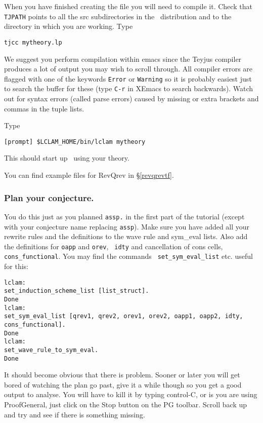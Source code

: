 When you have finished creating the file you will need to compile it.
Check that {\tt TJPATH} points to all the src
subdirectories in the \lclam\ distribution and to the directory in
which you are working.  Type
\begin{verbatim}
tjcc mytheory.lp
\end{verbatim}

We suggest you perform compilation within emacs since the Teyjus
compiler produces a lot of output you may wish to scroll through.  All
compiler errors are flagged with one of the keywords {\tt Error} or
{\tt Warning} so it is probably easiest just to search the buffer for
these (type {\tt C-r} in XEmacs to search backwards).  Watch out for
syntax errors (called parse errors) caused by missing or extra
brackets and commas in the tuple lists.

Type 
\begin{verbatim}
[prompt] $LCLAM_HOME/bin/lclam mytheory
\end{verbatim}
This should start up \lclam\ using your theory.

You can find example files for RevQrev in \S\ref{revqrevtf}. 

\subsubsection*{Plan your conjecture.}
You do this just as you planned {\tt assp.} in the first part of the
tutorial (except with your conjecture name replacing {\tt assp}).
Make sure you have added all your rewrite rules and the definitions
to the wave rule and sym\_eval lists.  Also add the definitions for
{\tt oapp} and {\tt orev}, {\tt
  idty} and cancellation of cons cells, {\tt cons\_functional}.  You may find the commands {\tt
  set\_sym\_eval\_list} etc. useful for this:
\begin{verbatim}
lclam:
set_induction_scheme_list [list_struct].
Done
lclam:
set_sym_eval_list [qrev1, qrev2, orev1, orev2, oapp1, oapp2, idty, cons_functional].
Done
lclam:
set_wave_rule_to_sym_eval.
Done
\end{verbatim}

It should become obvious that there is problem.  Sooner or later you
will get bored of watching the plan go past, give it a while though so
you get a good output to analyse.  You will have to kill it by typing
control-C, or is you are using ProofGeneral, just click on the Stop
button on the PG toolbar.  Scroll back up and try and see if there is
something missing.

